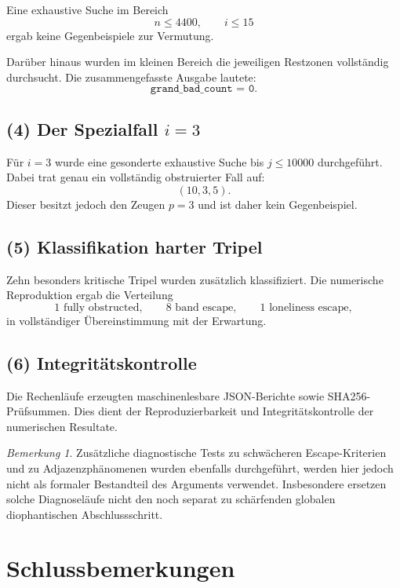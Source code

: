 \documentclass[12pt,a4paper]{article}
\theoremstyle{plain}
\theoremstyle{definition}
\theoremstyle{remark}
\newtheorem{bemerkung}{Bemerkung}
\begin{document}
	Eine exhaustive Suche im Bereich
	\[
	n\le 4400,\qquad i\le 15
	\]
	ergab keine Gegenbeispiele zur Vermutung.
	
	Darüber hinaus wurden im kleinen Bereich die jeweiligen Restzonen vollständig durchsucht. 
	Die zusammengefasste Ausgabe lautete:
	\[
	\texttt{grand\_bad\_count = 0}.
	\]
	
	\subsection*{(4) Der Spezialfall $i=3$}
	
	Für $i=3$ wurde eine gesonderte exhaustive Suche bis $j\le 10000$ durchgeführt. 
	Dabei trat genau ein vollständig obstruierter Fall auf:
	\[
	(10,3,5).
	\]
	Dieser besitzt jedoch den Zeugen $p=3$ und ist daher kein Gegenbeispiel.
	
	\subsection*{(5) Klassifikation harter Tripel}
	
	Zehn besonders kritische Tripel wurden zusätzlich klassifiziert. 
	Die numerische Reproduktion ergab die Verteilung
	\[
	1 \text{ fully obstructed},\qquad
	8 \text{ band escape},\qquad
	1 \text{ loneliness escape},
	\]
	in vollständiger Übereinstimmung mit der Erwartung.
	
	\subsection*{(6) Integritätskontrolle}
	
	Die Rechenläufe erzeugten maschinenlesbare JSON-Berichte sowie SHA256-Prüfsummen. 
	Dies dient der Reproduzierbarkeit und Integritätskontrolle der numerischen Resultate.
	
	\begin{bemerkung}
		Zusätzliche diagnostische Tests zu schwächeren Escape-Kriterien und zu Adjazenzphänomenen wurden ebenfalls durchgeführt, werden hier jedoch nicht als formaler Bestandteil des Arguments verwendet. 
		Insbesondere ersetzen solche Diagnoseläufe nicht den noch separat zu schärfenden globalen diophantischen Abschlussschritt.
	\end{bemerkung}
	
	\section{Schlussbemerkungen}
	
\end{document}
